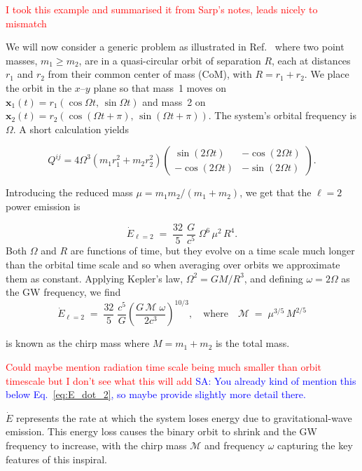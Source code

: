 \documentclass{article}
\newcommand{\Sarp}[1]{{\textcolor{blue}{{SA: #1}} }}
\begin{document}
\textcolor{red}{I took this example and summarised it from Sarp's notes, leads nicely to mismatch}

\noindent
We will now consider a generic problem as illustrated in Ref.~\cite{intoGRSarp} where two point masses, \(m_1 \ge m_2\), are in a quasi-circular orbit of separation \(R\),
each at distances \(r_1\) and \(r_2\) from their common center of mass (CoM), with
\(R = r_1 + r_2\). We place the orbit in the \(x\)--\(y\) plane so that mass~1 moves on
\(\mathbf{x}_1(t) = r_1(\cos\Omega t,\,\sin\Omega t)\) and mass~2 on
\(\mathbf{x}_2(t) = r_2(\cos(\Omega t+\pi),\,\sin(\Omega t+\pi))\). The system’s orbital
frequency is \(\Omega\). A short calculation yields

\begin{equation}
    Q^{ij} = 4 \Omega^3 \left(m_1 r_1^2 + m_2 r_2^2\right)
    \begin{pmatrix}
    \sin(2\Omega t) & -\cos(2\Omega t) \\
    -\cos(2\Omega t) & -\sin(2\Omega t)
    \end{pmatrix}.
\end{equation}

\noindent
Introducing the reduced mass \(\mu = m_1 m_2/(m_1 + m_2)\), we get that the \(\ell=2\) power emission is

\begin{equation}\label{eq:E_dot_2}
\dot{E}_{\ell=2}
\;=\;
\frac{32}{5}\;\frac{G}{c^5}\;\Omega^6\,\mu^2\,R^4.
\end{equation}
Both \(\Omega\) and \(R\) are functions of time, but they evolve on a time scale much longer than the orbital time
scale and so when averaging over orbits we approximate them as constant. Applying Kepler’s law, \(\Omega^2 = GM/R^3\), and defining
\(\omega = 2\Omega\) as the GW frequency, we find
\begin{equation}
\dot{E}_{\ell=2}
\;=\;
\frac{32}{5}\;\frac{c^5}{G}
\left(\frac{G\,\mathcal{M}\;\omega}{2c^3}\right)^{10/3},
\quad
\text{where}
\quad
\mathcal{M} \;=\;\mu^{3/5}\,M^{2/5}
\end{equation}

\noindent
is known as the chirp mass where $M = m_1+m_2$ is the total mass.

\noindent
\textcolor{red}{Could maybe mention radiation time scale being much smaller than orbit timescale but I don't see what this will add}
\Sarp{You already kind of mention this below Eq.~\eqref{eq:E_dot_2}, so maybe provide slightly
more detail there.}

\noindent
$ \dot{E} $ represents the rate at which the system loses energy due to gravitational-wave emission.
This energy loss causes the binary orbit to shrink and the GW frequency to increase, 
with the chirp mass \(\mathcal{M}\) and frequency \(\omega\) capturing the key features of this inspiral.
\end{document}

